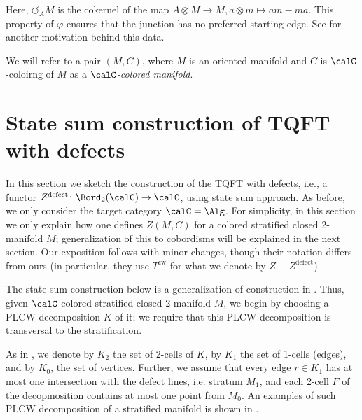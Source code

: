 \begin{defectfiguresetup}
\begin{definition}
\begin{itemize}
    		 Here, $\circlearrowleft_{A} M$ is the cokernel of the map $A \otimes M
    		 \rightarrow M, a \otimes m \mapsto am - ma$. This property of
    		 $\varphi$ ensures that the junction has no preferred starting edge.
    		 See \cite[Section 2.3]{carqueville} for another motivation behind
    		 this data.
  \end{itemize}
  We will refer to a pair $(M, C)$, where $M$ is an oriented manifold and $C$
  is $\calC$-coloirng of $M$ as a \emph{$\calC$-colored
  manifold}.
\end{definition}

\section{State sum construction of TQFT with defects}\label{s:defect-statesum}

In this section we sketch the construction of the TQFT with defects, i.e., a
functor $Z^{\mathrm{defect}}\colon \Bord_2(\calC)\to \calC$, using state sum
approach.  As before, we only consider the target category $\calC=\Alg$. For
simplicity, in this section we only explain how one defines $Z(M,C)$ for a
colored stratified closed 2-manifold $M$; generalization of this to cobordisms
will be explained in the next section. Our exposition follows \cite{dkr} with
minor changes, though their notation differs from ours (in particular, they use
$T^{\mathrm{cw}}$ for what we denote by $Z\equiv Z^{\mathrm{defect}}$).

The state sum construction below is a generalization of construction in
. Thus, given $\calC$-colored stratified closed 2-manifold
$M$, we begin by choosing a PLCW decomposition $K$ of it; we require that this
PLCW decomposition is transversal to the stratification.


As in , we denote by $K_2$ the set of 2-cells of $K$, by
$K_1$ the set of 1-cells (edges), and by  $K_0$, the set of vertices. Further,
we assume that every edge $r\in K_1$ has at most one intersection with the
defect lines, i.e. stratum $M_1$, and each 2-cell $F$ of the decopmosition
contains at most one point from $M_0$. An examples of such PLCW decomposition
of a stratified manifold is shown in .




\end{defectfiguresetup}
